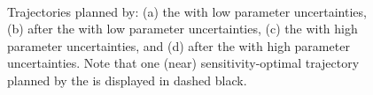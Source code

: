 \begin{figure} [h!]
    \centering
    \\
    \caption{Trajectories planned by: (a) the  with low parameter uncertainties, (b) after the  with low parameter uncertainties, (c) the  with high parameter uncertainties, and (d) after the  with high parameter uncertainties.
    Note that one (near) sensitivity-optimal trajectory planned by the  is displayed in dashed black.}%
    \label{fig:2way}%
\end{figure}

